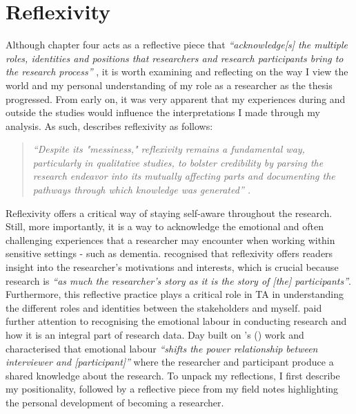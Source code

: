 \newpage
\section{Reflexivity}
\label{Method:Reflectivity}
Although chapter four acts as a reflective piece that \textit{``acknowledge[s] the multiple roles, identities and positions that researchers and research participants bring to the research process''} \citep[p.395]{milner2007race}, it is worth examining and reflecting on the way I view the world and my personal understanding of my role as a researcher as the thesis progressed. From early on, it was very apparent that my experiences during and outside the studies would influence the interpretations I made through my analysis. As such, \cite{probst2015eye} describes reflexivity as follows:
\begin{quote}
\textit{``Despite its "messiness," reflexivity remains a fundamental way, particularly in qualitative studies, to bolster credibility by parsing the research endeavor into its mutually affecting parts and documenting the pathways through which knowledge was generated'' \citep{probst2015eye}.
}\end{quote}

Reflexivity offers a critical way of staying self-aware throughout the research. Still, more importantly, it is a way to acknowledge the emotional and often challenging experiences that a researcher may encounter when working within sensitive settings - such as dementia. \cite{corlett2018reflexivity} recognised that reflexivity offers readers insight into the researcher's motivations and interests, which is crucial because research is \textit{``as much the researcher's story as it is the story of [the] participants''}. Furthermore, this reflective practice plays a critical role in TA in understanding the different roles and identities between the stakeholders and myself. \cite{day2012reflexive} paid further attention to recognising the emotional labour in conducting research and how it is an integral part of research data. Day built on \citeauthor{hoffmann2007open}'s (\citeyear{hoffmann2007open}) work and characterised that emotional labour \textit{``shifts the power relationship between interviewer and [participant]''} where the researcher and participant produce a shared knowledge about the research. To unpack my reflections, I first describe my positionality, followed by a reflective piece from my field notes highlighting the personal development of becoming a researcher.

